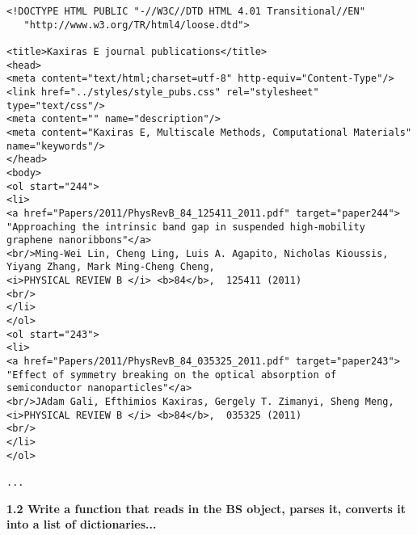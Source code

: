 \documentclass[11pt]{article}
\begin{document}
\begin{verbatim}
<!DOCTYPE HTML PUBLIC "-//W3C//DTD HTML 4.01 Transitional//EN"
   "http://www.w3.org/TR/html4/loose.dtd">

<title>Kaxiras E journal publications</title>
<head>
<meta content="text/html;charset=utf-8" http-equiv="Content-Type"/>
<link href="../styles/style_pubs.css" rel="stylesheet" type="text/css"/>
<meta content="" name="description"/>
<meta content="Kaxiras E, Multiscale Methods, Computational Materials" name="keywords"/>
</head>
<body>
<ol start="244">
<li>
<a href="Papers/2011/PhysRevB_84_125411_2011.pdf" target="paper244">
"Approaching the intrinsic band gap in suspended high-mobility graphene nanoribbons"</a>
<br/>Ming-Wei Lin, Cheng Ling, Luis A. Agapito, Nicholas Kioussis, Yiyang Zhang, Mark Ming-Cheng Cheng,
<i>PHYSICAL REVIEW B </i> <b>84</b>,  125411 (2011)
<br/>
</li>
</ol>
<ol start="243">
<li>
<a href="Papers/2011/PhysRevB_84_035325_2011.pdf" target="paper243">
"Effect of symmetry breaking on the optical absorption of semiconductor nanoparticles"</a>
<br/>JAdam Gali, Efthimios Kaxiras, Gergely T. Zimanyi, Sheng Meng,
<i>PHYSICAL REVIEW B </i> <b>84</b>,  035325 (2011)
<br/>
</li>
</ol>

...
\end{verbatim}

    \textbf{1.2 Write a function that reads in the BS object, parses it,
converts it into a list of dictionaries...}
\end{document}
